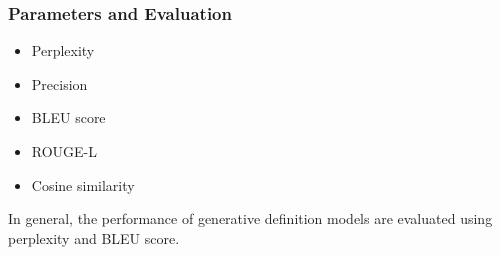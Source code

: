 \subsubsection{Parameters and Evaluation}
\begin{itemize}
    \item Perplexity
    \item Precision
    \item BLEU score
    \item ROUGE-L
    \item Cosine similarity
\end{itemize}

In general, the performance of generative definition models are evaluated using
perplexity and BLEU score.
